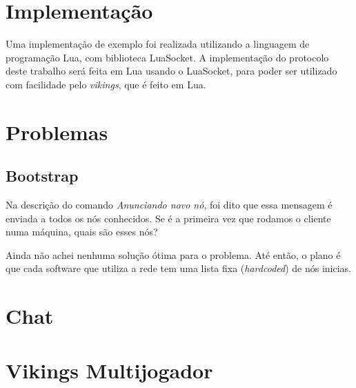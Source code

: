 \section{Implementação}
  Uma implementação de exemplo foi realizada utilizando a linguagem de programação Lua, com biblioteca
  LuaSocket.
  A implementação do protocolo deste trabalho será feita em Lua usando o LuaSocket, %
  para poder ser utilizado com facilidade pelo \textit{vikings}, que é feito em Lua.

\section{Problemas}
  \subsection{Bootstrap}
    Na descrição do comando \textit{Anunciando novo nó}, foi dito que essa mensagem é enviada a
    todos os nós conhecidos. Se é a primeira vez que rodamos o cliente numa máquina, quais são
    esses nós?
    
    Ainda não achei nenhuma solução ótima para o problema. Até então, o plano é que cada software
    que utiliza a rede tem uma lista fixa (\textit{hardcoded}) de nós inicias.

\section{Chat}
\label{sec:rede:chat}

\section{Vikings Multijogador}
\label{sec:rede:vikings}
